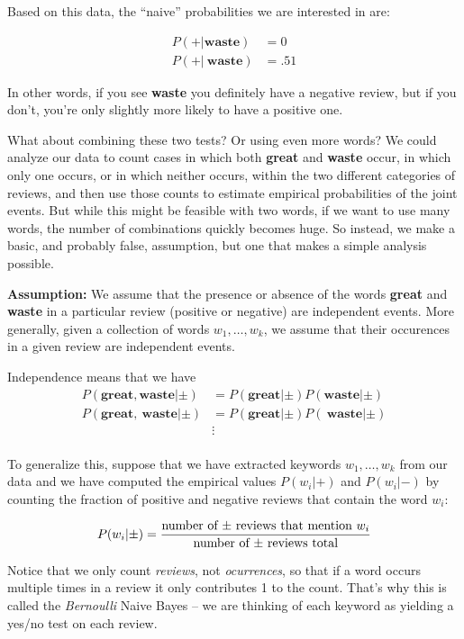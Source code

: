 \documentclass[
]{article}
\begin{document}
Based on this data, the ``naive'' probabilities we are interested in
are:

\begin{align*}
P(+|\mathbf{waste}) &= 0\\
P(+|\mathbf{~waste}) &= .51
\end{align*}

In other words, if you see \textbf{waste} you definitely have a negative
review, but if you don't, you're only slightly more likely to have a
positive one.

What about combining these two tests? Or using even more words? We could
analyze our data to count cases in which both \textbf{great} and
\textbf{waste} occur, in which only one occurs, or in which neither
occurs, within the two different categories of reviews, and then use
those counts to estimate empirical probabilities of the joint events.
But while this might be feasible with two words, if we want to use many
words, the number of combinations quickly becomes huge. So instead, we
make a basic, and probably false, assumption, but one that makes a
simple analysis possible.

\textbf{Assumption:} We assume that the presence or absence of the words
\textbf{great} and \textbf{waste} in a particular review (positive or
negative) are independent events. More generally, given a collection of
words \(w_1,\ldots, w_k\), we assume that their occurences in a given
review are independent events.

Independence means that we have \begin{align*}
P(\mathbf{great},\mathbf{waste}|\pm) &= P(\mathbf{great}|\pm)P(\mathbf{waste}|\pm)\\
P(\mathbf{great},\mathbf{~waste}|\pm) &= P(\mathbf{great}|\pm)P(\mathbf{~waste}|\pm)\\
 &\vdots \\
\end{align*}

To generalize this, suppose that we have extracted keywords
\(w_1,\ldots, w_k\) from our data and we have computed the empirical
values \(P(w_{i}|+)\) and \(P(w_{i}|-)\) by counting the fraction of
positive and negative reviews that contain the word \(w_{i}\):

\[
P(w_{i}|\pm) = \frac{\hbox{\rm number of $\pm$ reviews that mention $w_{i}$}}{\hbox{\rm number of $\pm$ reviews total}}
\]

Notice that we only count \emph{reviews}, not \emph{ocurrences}, so that
if a word occurs multiple times in a review it only contributes 1 to the
count. That's why this is called the \emph{Bernoulli} Naive Bayes -- we
are thinking of each keyword as yielding a yes/no test on each review.
\end{document}
